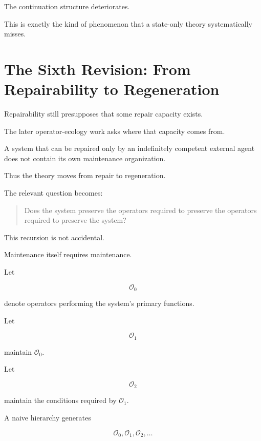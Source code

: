 \documentclass[11pt]{article}
\theoremstyle{remark}
\begin{document}
The continuation structure deteriorates.

This is exactly the kind of phenomenon that a state-only theory systematically misses.

\section{The Sixth Revision: From Repairability to Regeneration}

Repairability still presupposes that some repair capacity exists.

The later operator-ecology work asks where that capacity comes from.

A system that can be repaired only by an indefinitely competent external agent does not contain its own maintenance organization.

Thus the theory moves from repair to regeneration.

The relevant question becomes:

\begin{quote}
Does the system preserve the operators required to preserve the operators required to preserve the system?
\end{quote}

This recursion is not accidental.

Maintenance itself requires maintenance.

Let

\begin{equation}
\mathcal{O}_0
\end{equation}

denote operators performing the system's primary functions.

Let

\begin{equation}
\mathcal{O}_1
\end{equation}

maintain $\mathcal{O}_0$.

Let

\begin{equation}
\mathcal{O}_2
\end{equation}

maintain the conditions required by $\mathcal{O}_1$.

A naive hierarchy generates

\begin{equation}
\mathcal{O}_0,
\mathcal{O}_1,
\mathcal{O}_2,
\ldots
\end{equation}
\end{document}
